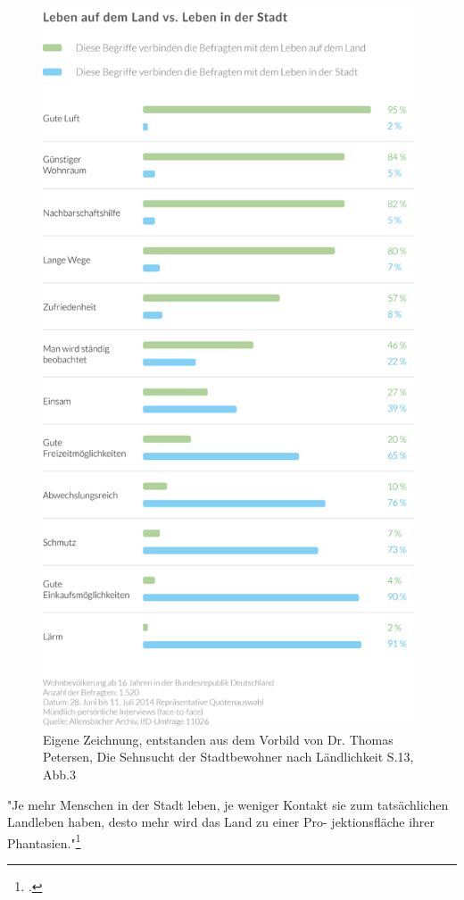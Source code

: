 \documentclass{scrartcl}
\begin{document}
\begin{figure}[htbp]
\centering
\includegraphics[width=11cm]{image_folder/SchaubildStadtVsLand_Umfrage.png}
\caption{Eigene Zeichnung, entstanden aus dem Vorbild von Dr. Thomas Petersen, Die Sehnsucht der Stadtbewohner nach Ländlichkeit S.13, Abb.3}
\label{fig:SchaubildStadtVsLandUmfrage}
\end{figure}

\begin{displayquote}
"Je mehr Menschen in der Stadt leben, je weniger Kontakt sie zum tatsächlichen Landleben haben, desto mehr wird das Land zu einer Pro- jektionsfläche ihrer Phantasien."\footcite[S. 8]{Dr.ThomasPetersen2014DieLandlichkeit}
\end{displayquote}
\end{document}
